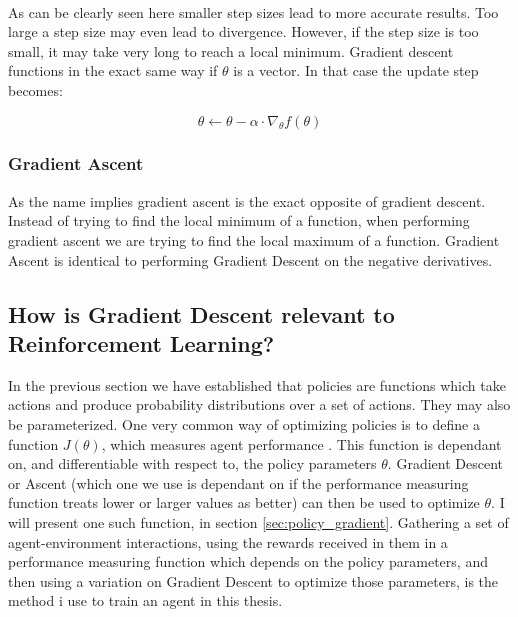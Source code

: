 \noindent
\\ As can be clearly seen here smaller step sizes lead to more accurate results. Too large a step size may even lead to divergence. However, if the step size is too small, it may take very long to reach a local minimum. Gradient descent functions in the exact same way if $\theta$ is a vector. In that case the update step becomes:

\begin{equation}\label{Graident_Descent:basic_update_vector}
    \theta \leftarrow \theta - \alpha \cdot \nabla_\theta f(\theta)
\end{equation}

\subsubsection{Gradient Ascent}\label{gd:gradient_ascent}
As the name implies gradient ascent is the exact opposite of gradient descent. Instead of trying to find the local minimum of a function, when performing gradient ascent we are trying to find the local maximum of a function. Gradient Ascent is identical to performing Gradient Descent on the negative derivatives. 

\subsection{How is Gradient Descent relevant to Reinforcement Learning?}\label{gd:relevance}
In the previous section we have established that policies are functions which take actions and produce probability distributions over a set of actions. They may also be parameterized. One very common way of optimizing policies is to define a function $J(\theta)$, which measures agent performance . This function is dependant on, and differentiable with respect to, the policy parameters $\theta$. Gradient Descent or Ascent (which one we use is dependant on if the performance measuring function treats lower or larger values as better) can then be used to optimize $\theta$. I will present one such function, in section \ref{sec:policy_gradient}. Gathering a set of agent-environment interactions, using the rewards received in them in a performance measuring function which depends on the policy parameters, and then using a variation on Gradient Descent to optimize those parameters, is the method i use to train an agent in this thesis. 

